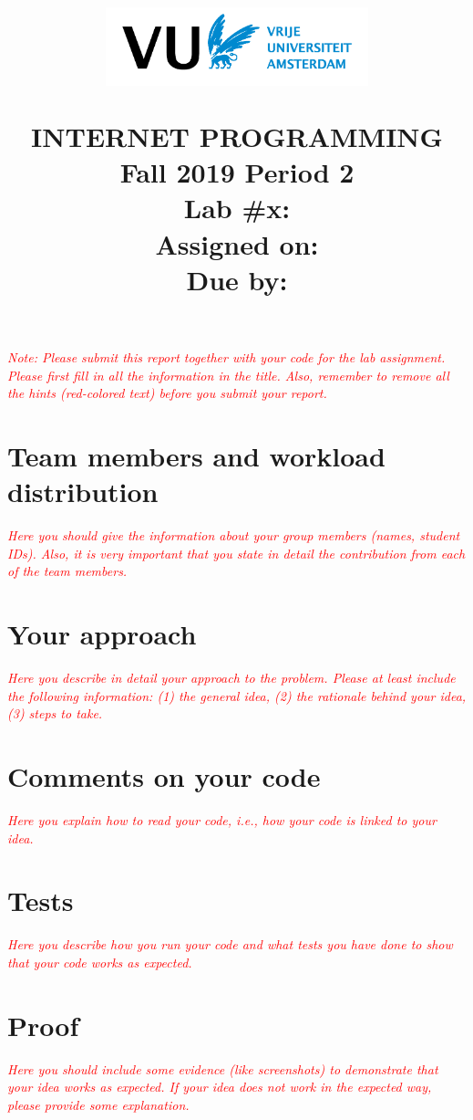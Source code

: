 \documentclass[11pt]{article}
\title{
\vspace{-20mm}\begin{figure}[h]
\centering
\includegraphics[width=3in]{vulogo.png}
\label{escudo}
\end{figure}
\vspace{0.5cm}
\uppercase{Internet Programming}\\
Fall 2019 Period 2\\
\vspace{0.5cm}
\Large{Lab \#x: \hint{here lab title}}\\\vspace{0.2cm}
\large{Assigned on: \hint{Example: November 11, 2019}\\
Due by: \hint{Example: November 11, 2019}}
}
\newcommand{\hint}[1]{\textcolor{red}{\textit{#1}}}
\begin{document}
\maketitle

\hint{Note: Please submit this report together with your code for the lab assignment. Please first fill in all the information in the title. Also, remember to remove all the hints (red-colored text) before you submit your report.}

\section{Team members and workload distribution}
\hint{Here you should give the information about your group members (names, student IDs). Also, it is very important that you state in detail the contribution from each of the team members.}

\section{Your approach}

\hint{Here you describe in detail your approach to the problem. Please at least include the following information: (1) the general idea, (2) the rationale behind your idea, (3) steps to take.}

\section{Comments on your code}

\hint{Here you explain how to read your code, i.e., how your code is linked to your idea.}


\section{Tests}

\hint{Here you describe how you run your code and what tests you have done to show that your code works as expected.}

\section{Proof}

\hint{Here you should include some evidence (like screenshots) to demonstrate that your idea works as expected. If your idea does not work in the expected way, please provide some explanation.}
\end{document}
